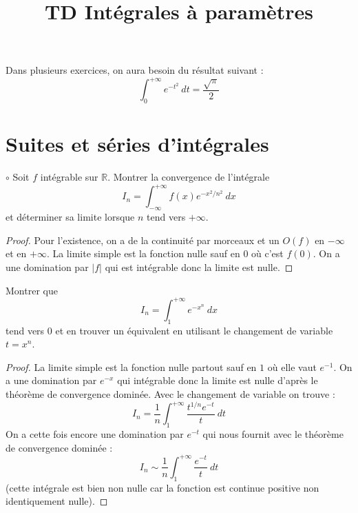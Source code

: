 \documentclass[french,a4paper]{article}
\title{TD Intégrales à paramètres}
\newcommand{\R}{\mathbb{R}}
\theoremstyle{plain}
\theoremstyle{definition}
\theoremstyle{remark}
\begin{document}
\maketitle

Dans plusieurs exercices, on aura besoin du résultat suivant : $$\int_{0}^{+\infty}e^{-t^2}\ dt=\frac{\sqrt{\pi}}{2}$$

\section{Suites et séries d'intégrales}
\begin{ex}[Moulin.IP.01]{$\circ$}
	Soit $f$ intégrable sur $\R$. Montrer la convergence de l'intégrale $$I_n=\int_{-\infty}^{+\infty}f(x)e^{-x^2/n^2}\ dx$$ et déterminer sa limite lorsque $n$ tend vers $+\infty$.
\end{ex}
\begin{proof}
	Pour l'existence, on a de la continuité par morceaux et un $O(f)$ en $-\infty$ et en $+\infty$. La limite simple est la fonction nulle sauf en $0$ où c'est $f(0)$. On a une domination par $\lvert f\rvert$ qui est intégrable donc la limite est nulle.
\end{proof}

\begin{ex}[Moulin.IP.02]{}
	Montrer que $$I_n=\int_{1}^{+\infty}e^{-x^n}\ dx$$ tend vers $0$ et en trouver un équivalent en utilisant le changement de variable $t=x^n$.
\end{ex}
\begin{proof}
	La limite simple est la fonction nulle partout sauf en $1$ où elle vaut $e^{-1}$. On a une domination par $e^{-x}$ qui intégrable donc la limite est nulle d'après le théorème de convergence dominée. Avec le changement de variable on trouve : $$I_n=\frac{1}{n}\int_{1}^{+\infty}\frac{t^{1/n}e^{-t}}{t}\ dt$$ On a cette fois encore une domination par $e^{-t}$ qui nous fournit avec le théorème de convergence dominée : $$I_n\sim\frac{1}{n}\int_{1}^{+\infty}\frac{e^{-t}}{t}\ dt$$ (cette intégrale est bien non nulle car la fonction est continue positive non identiquement nulle).
\end{proof}
\end{document}
